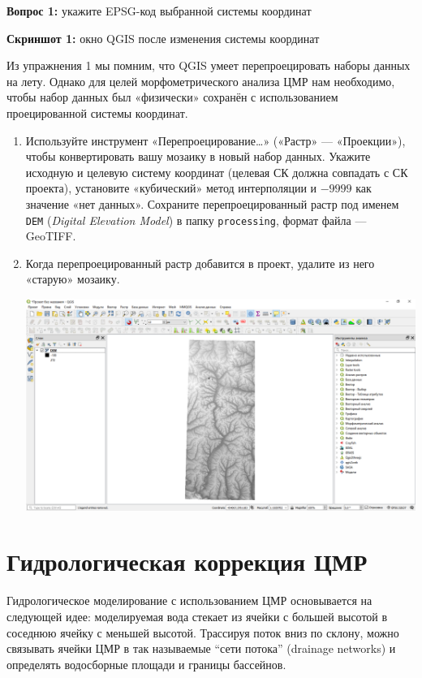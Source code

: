 \documentclass[
  12pt,
]{book}
\begin{document}
\textbf{Вопрос 1:} укажите EPSG-код выбранной системы координат

\textbf{Скриншот 1:} окно QGIS после изменения системы координат

Из упражнения 1 мы помним, что QGIS умеет перепроецировать наборы данных на лету. Однако для целей морфометрического анализа ЦМР нам необходимо, чтобы набор данных был «физически» сохранён с использованием проецированной системы координат.

\begin{enumerate}
\def\labelenumi{\arabic{enumi}.}
\setcounter{enumi}{9}
\item
  Используйте инструмент «Перепроецирование\ldots» («Растр» --- «Проекции»), чтобы конвертировать вашу мозаику в новый набор данных. Укажите исходную и целевую систему координат (целевая СК должна совпадать с СК проекта), установите «кубический» метод интерполяции и \(-9999\) как значение «нет данных». Сохраните перепроецированный растр под именем \texttt{DEM} (\emph{Digital Elevation Model}) в папку \texttt{processing}, формат файла --- GeoTIFF.
\item
  Когда перепроецированный растр добавится в проект, удалите из него «старую» мозаику.

  \includegraphics{images/Ex13/mosaic_reproj.png}
\end{enumerate}

\hypertarget{hydrodem-preprocessing}{%
\section{Гидрологическая коррекция ЦМР}\label{hydrodem-preprocessing}}

Гидрологическое моделирование с использованием ЦМР основывается на следующей идее: моделируемая вода стекает из ячейки с большей высотой в соседнюю ячейку с меньшей высотой. Трассируя поток вниз по склону, можно связывать ячейки ЦМР в так называемые ``сети потока'' (drainage networks) и определять водосборные площади и границы бассейнов.
\end{document}
